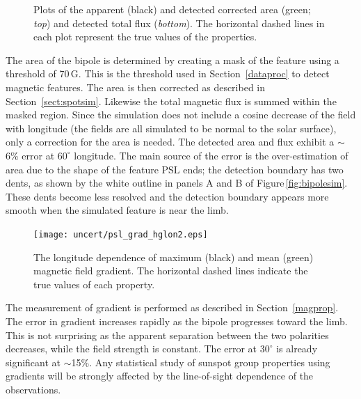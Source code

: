 \begin{figure}[!t]
\caption[Plots of corrected area and flux.]{Plots of the apparent (black) and detected corrected area (green; \emph{top}) and detected total flux (\emph{bottom}). The horizontal dashed lines in each plot represent the true values of the properties.}
\label{fig:bipoleareaflux}
\end{figure}

The area of the bipole is determined by creating a mask of the feature using a threshold of 70\,G. This is the threshold used in Section~\ref{dataproc} to detect magnetic features. The area is then corrected as described in Section~\ref{sect:spotsim}.  Likewise the total magnetic flux is summed within the masked region. Since the simulation does not include a cosine decrease of the field with longitude (the fields are all simulated to be normal to the solar surface), only a correction for the area is needed. The detected area and flux exhibit a $\sim$6\% error at $60^\circ$ longitude. The main source of the error is the over-estimation of area due to the shape of the feature \gls{PSL} ends; the detection boundary has two dents, as shown by the white outline in panels A and B of Figure\,\ref{fig:bipolesim}. These dents become less resolved and the detection boundary appears more smooth when the simulated feature is near the limb. 

\begin{figure}[!t]
\centerline{\texttt{[image: uncert/psl\_grad\_hglon2.eps]}}
\caption[Longitudinal dependence of magnetic gradient.]{The longitude dependence of maximum (black) and mean (green) magnetic field gradient. The horizontal dashed lines indicate the true values of each property.}
\label{fig:bipolegradient}
\end{figure}

The measurement of gradient is performed as described in Section~\ref{magprop}. The error in gradient increases rapidly as the bipole progresses toward the limb. This is not surprising as the apparent separation between the two polarities decreases, while the field strength is constant. The error at $30^\circ$ is already significant at $\sim$15\%. Any statistical study of sunspot group properties using gradients will be strongly affected by the line-of-sight dependence of the observations.

